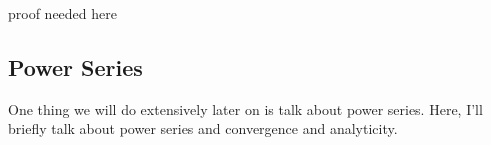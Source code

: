 proof needed here

\subsection{Power Series}
One thing we will do extensively later on is talk about power series. Here, I'll briefly talk about power series and convergence and analyticity.